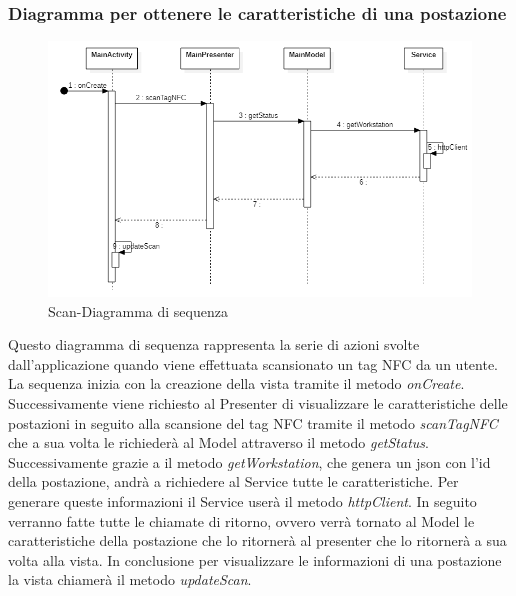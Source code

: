 \subsubsection{Diagramma per ottenere le caratteristiche di una postazione}
\begin{figure}[H]
	\centering
	\includegraphics[width=16cm]{res/images/apputenti-mainScanSeq.png}
	\caption{Scan-Diagramma di sequenza}
	\label{fig:Scan-Diagramma di sequenza}
\end{figure}
Questo diagramma di sequenza rappresenta la serie di azioni svolte dall'applicazione quando viene effettuata scansionato un tag NFC da un utente.
La sequenza inizia con la creazione della vista tramite il metodo \textit{onCreate}.
Successivamente viene richiesto al Presenter di visualizzare le caratteristiche delle postazioni in seguito alla scansione del tag NFC tramite il metodo \textit{scanTagNFC} che a sua volta le richiederà al Model attraverso il metodo \textit{getStatus}.
Successivamente grazie a il metodo \textit{getWorkstation}, che genera un json con l'id della postazione, andrà a richiedere al Service tutte le caratteristiche. Per generare queste informazioni il Service userà il metodo \textit{httpClient}.
In seguito verranno fatte tutte le chiamate di ritorno, ovvero verrà tornato al Model le caratteristiche della postazione che lo ritornerà al presenter che lo ritornerà a sua volta alla vista.
In conclusione per visualizzare le informazioni di una postazione la vista chiamerà il metodo \textit{updateScan}.



